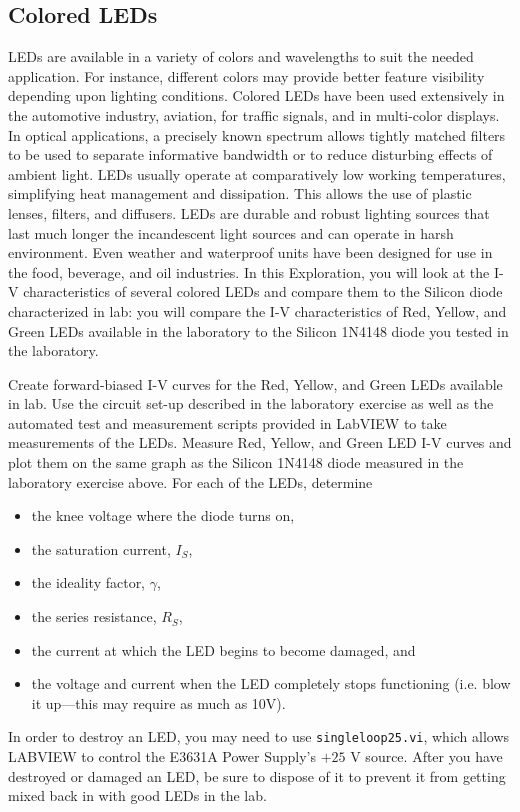\documentclass[12pt]{../manual}
\begin{document}
\newpage
\subsection{Colored LEDs}
LEDs are available in a variety of colors and wavelengths to suit the needed application. For instance, different colors may provide better feature visibility depending upon lighting conditions. Colored LEDs have been used extensively in the automotive industry, aviation, for traffic signals, and in multi-color displays. In optical applications, a precisely known spectrum allows tightly matched filters to be used to separate informative bandwidth or to reduce disturbing effects of ambient light. LEDs usually operate at comparatively low working temperatures, simplifying heat management and dissipation. This allows the use of plastic lenses, filters, and diffusers. LEDs are durable and robust lighting sources that last much longer the incandescent light sources and can operate in harsh environment. Even weather and waterproof units have been designed for use in the food, beverage, and oil industries. In this Exploration, you will look at the I-V characteristics of several colored LEDs and compare them to the Silicon diode characterized in lab: you will compare the I-V characteristics of Red, Yellow, and Green LEDs available in the laboratory to the Silicon 1N4148 diode you tested in the laboratory.

Create forward-biased I-V curves for the Red, Yellow, and Green LEDs available in lab. Use the circuit set-up described in the laboratory exercise as well as the automated test and measurement scripts provided in LabVIEW to take measurements of the LEDs. Measure Red, Yellow, and Green LED I-V curves and plot them on the same graph as the Silicon 1N4148 diode measured in the laboratory exercise above. For each of the LEDs, determine 
\renewcommand\labelitemi{$\square$}
\begin{itemize}
\item the knee voltage where the diode turns on, 
\item the saturation current, $I_S$, 
\item the ideality factor, $\gamma$,
\item the series resistance, $R_S$,
\item the current at which the LED begins to become damaged, and 
\item the voltage and current when the LED completely stops functioning (i.e. blow it up---this may require as much as 10V). 
\end{itemize}
In order to destroy an LED, you may need to use {\tt singleloop25.vi}, which allows LABVIEW to control the E3631A Power Supply's $+25$ V source. After you have destroyed or damaged an LED, be sure to dispose of it to prevent it from getting mixed back in with good LEDs in the lab.
\end{document}

